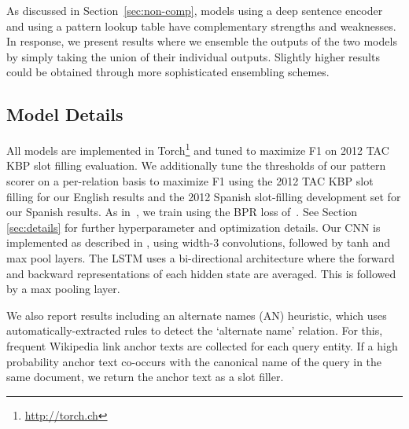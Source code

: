 
As discussed in Section~\ref{sec:non-comp}, models using a deep sentence encoder and using a pattern lookup table have complementary strengths and weaknesses. In response, we present results where we ensemble the outputs of the two models by simply taking the union of their individual outputs. Slightly higher results could be obtained through more sophisticated ensembling schemes. %


\subsection {Model Details}
\label{sec:models}
All models are implemented in Torch\footnote{\url{http://torch.ch}} and tuned to maximize F1 on 2012 TAC KBP slot filling evaluation. We additionally tune the thresholds of our pattern scorer on a per-relation basis to maximize F1 using the 2012 TAC KBP slot filling for our English results and the 2012 Spanish slot-filling development set for our Spanish results. As in~\citet{limin}, we train using the BPR loss of~\citet{rendle2009bpr}. See Section \ref{sec:details} for further hyperparameter and optimization details. Our CNN is implemented as described in \cite{toutanova2015representing}, using width-3 convolutions, followed by tanh and max pool layers. The LSTM uses a bi-directional architecture where the forward and backward representations of each hidden state are averaged. This is followed by a max pooling layer.

We also report results including an alternate names (AN) heuristic, which uses automatically-extracted rules to detect the `alternate name' relation.
For this, frequent Wikipedia link anchor texts are collected for each query entity.
If a high probability anchor text co-occurs with the canonical name of the query in the same document, we return the anchor text as a slot filler.